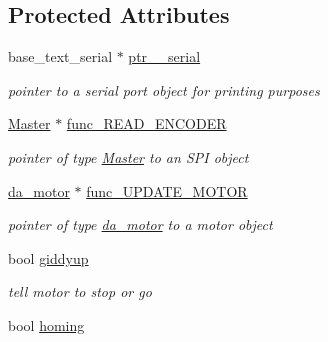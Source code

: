 \subsection*{Protected Attributes}
\begin{DoxyCompactItemize}
\item 
\hypertarget{classtask___p_i_d_abb3ce7591adb11f5dfaf185a60783079}{base\-\_\-text\-\_\-serial $\ast$ \hyperlink{classtask___p_i_d_abb3ce7591adb11f5dfaf185a60783079}{ptr\-\_\-\_\-serial}}\label{classtask___p_i_d_abb3ce7591adb11f5dfaf185a60783079}

\begin{DoxyCompactList}\small\item\em pointer to a serial port object for printing purposes \end{DoxyCompactList}\item 
\hypertarget{classtask___p_i_d_a8ed91ccc6f7ce2161f82911fafd35a2b}{\hyperlink{class_master}{Master} $\ast$ \hyperlink{classtask___p_i_d_a8ed91ccc6f7ce2161f82911fafd35a2b}{func\-\_\-\-R\-E\-A\-D\-\_\-\-E\-N\-C\-O\-D\-E\-R}}\label{classtask___p_i_d_a8ed91ccc6f7ce2161f82911fafd35a2b}

\begin{DoxyCompactList}\small\item\em pointer of type \hyperlink{class_master}{Master} to an S\-P\-I object \end{DoxyCompactList}\item 
\hypertarget{classtask___p_i_d_a3b21278136079ae694190e3f620c40cf}{\hyperlink{classda__motor}{da\-\_\-motor} $\ast$ \hyperlink{classtask___p_i_d_a3b21278136079ae694190e3f620c40cf}{func\-\_\-\-U\-P\-D\-A\-T\-E\-\_\-\-M\-O\-T\-O\-R}}\label{classtask___p_i_d_a3b21278136079ae694190e3f620c40cf}

\begin{DoxyCompactList}\small\item\em pointer of type \hyperlink{classda__motor}{da\-\_\-motor} to a motor object \end{DoxyCompactList}\item 
\hypertarget{classtask___p_i_d_a4db9c3da4224504ff3689ad2e16eeeab}{bool \hyperlink{classtask___p_i_d_a4db9c3da4224504ff3689ad2e16eeeab}{giddyup}}\label{classtask___p_i_d_a4db9c3da4224504ff3689ad2e16eeeab}

\begin{DoxyCompactList}\small\item\em tell motor to stop or go \end{DoxyCompactList}\item 
\hypertarget{classtask___p_i_d_a89911b07245fec5c4403f9f781f02788}{bool \hyperlink{classtask___p_i_d_a89911b07245fec5c4403f9f781f02788}{homing}}\label{classtask___p_i_d_a89911b07245fec5c4403f9f781f02788}


\end{DoxyCompactItemize}
